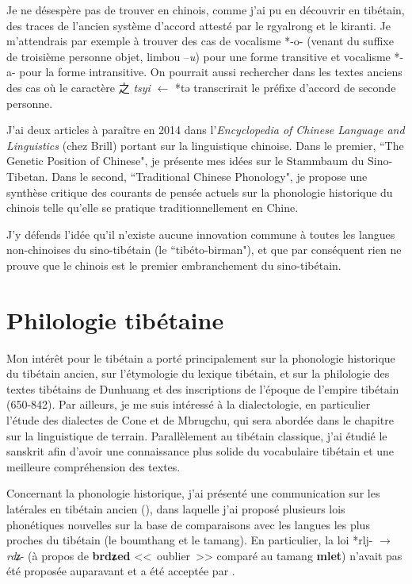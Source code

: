 \documentclass[oldfontcommands,oneside,a4paper,11pt]{memoir}
\newcommand{\ipa}[1]{{\phon\textbf{#1}}}
\newcommand{\zh}[1]{{\cn #1}}
\begin{document}
Je ne désespère pas de trouver en chinois, comme j'ai pu en découvrir en tibétain, des traces de l'ancien système d'accord attesté par le rgyalrong et le kiranti. Je m'attendrais par exemple à trouver des cas de vocalisme *-o- (venant du suffixe de troisième personne objet, limbou --\textit{u}) pour une forme transitive et vocalisme *-a- pour la forme intransitive. On pourrait aussi rechercher dans les textes anciens des cas où le caractère \zh{之} \textit{tsyi} $\leftarrow$ *tə transcrirait le préfixe d'accord de seconde personne.  


J'ai deux articles à paraître en 2014 dans l'\textit{Encyclopedia of Chinese Language and Linguistics} (chez Brill) portant sur la linguistique chinoise. Dans le premier, ``The Genetic Position of Chinese", je présente mes idées sur le Stammbaum du Sino-Tibetan. Dans le second, ``Traditional Chinese Phonology", je propose une synthèse critique des courants de pensée actuels sur la phonologie historique du chinois telle qu'elle se pratique traditionnellement en Chine.

J'y défends l'idée qu'il n'existe aucune innovation commune à toutes les langues non-chinoises du sino-tibétain (le ``tibéto-birman"), et que par conséquent rien ne prouve que le chinois est le premier embranchement du sino-tibétain.

\section{Philologie tibétaine}
Mon intérêt pour le tibétain a porté principalement sur la phonologie historique du tibétain ancien, sur l’étymologie du lexique tibétain, et sur la philologie des textes tibétains de Dunhuang et des inscriptions de l’époque de l’empire tibétain (650-842). Par ailleurs, je me suis intéressé à la dialectologie, en particulier l'étude des dialectes de Cone et de Mbrugchu, qui sera   abordée dans le chapitre sur la linguistique de terrain. Parallèlement au tibétain classique, j'ai étudié le sanskrit afin d'avoir une connaissance plus solide du vocabulaire tibétain et une meilleure compréhension des textes.

Concernant la phonologie historique, j’ai présenté une communication sur les latérales en tibétain ancien (\citealt{jacques04thimphu}), dans laquelle j’ai proposé plusieurs lois phonétiques nouvelles sur la base de comparaisons avec les langues les plus proches du tibétain (le boumthang et le tamang). En particulier, la loi *rlj- $\rightarrow $ \textit{rdʑ}- (à propos de \ipa{brdʑed} <<~oublier~>> comparé au tamang \ipa{mlet}) n'avait pas été proposée auparavant et a été acceptée par \citet{hill13laterals}.
\end{document}
